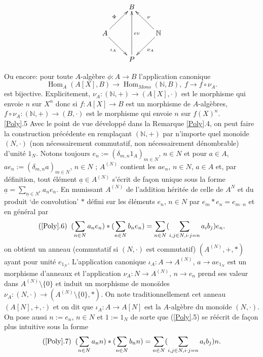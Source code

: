 \documentclass[a4paper, oneside, 12pt]{book}
\theoremstyle{theoremeStyle} %
\theoremstyle{definition} %
\DeclareMathOperator{\SHom}{Hom}
\newcommand{\N}{\mathbb{N}}
\begin{document}
  $$ \xymatrix{ & B \\ A \ar[ru]^\Phi \ar[rd]_{\iota_A} & & \mathbb{N} \ar[lu]_\nu \ar[ld]^{\nu_A} \\ & P \ar[uu]_{ev} } $$

 Ou encore: pour toute $A$-algèbre $\phi:A\rightarrow B$  l'application canonique
$$\SHom_A(A[X],B)\rightarrow \SHom_{Mono}(\N,B),\; f\rightarrow f\circ \nu_A.$$
 est bijective. Explicitement, $\nu_A:(\N,+)\rightarrow (A[X],\cdot)$ est le morphisme qui envoie $n$ sur $X^n$ donc si $f:A[X]\rightarrow B$ est un morphisme de $A$-algèbres, $f\circ \nu_A:(\N,+)\rightarrow (B,\cdot)$  est le morphisme qui envoie $n$ sur $f(X)^n$.\\



  \ref{Poly}.5 Avec le point de vue développé dans la Remarque  \ref{Poly}.4, on peut faire la construction précédente en rempla\c{c}ant $(\N,+)$ par n'importe quel monoïde $(N,\cdot)$ (non nécessairement commutatif, non nécessairement dénombrable) d'unité $1_N$.   Notons toujours $e_{n}:=(\delta_{m,n}1_{A})_{m\in N}$, $n\in N$ et pour $a\in A$, $ae_{n}:=(\delta_{m,n}a)_{m\in  N}$, $n\in N$ ; $A^{(N)}$ contient les $ae_{n}$, $n\in N$, $a\in A$ et, par définition,  tout élément $\underline{a}\in A^{(N)}$ s'écrit de fa\c{c}on unique sous la forme $\underline{a}=\sum_{\underline{n}\in N^r}a_ne_{n}$. En munissant $A^{(N)}$ de l'addition héritée de celle de $A^{N}$ et du produit `de convolution' $*$ défini sur les éléments $e_{n}$, $n\in N$ par
$e_{m}*e_{n}=e_{m\cdot n} $ et en général par
$$(\ref{Poly}.6)\;\; (\sum_{n\in N}a_{n}e_{n}) *(\sum_{n\in N}b_{n}e_{n})=\sum_{n\in N}(\sum_{i,j\in N,i\cdot j=n}a_{i}b_{j})e_{n}.$$
on obtient un anneau (commutatif si $(N,\cdot)$ est commutatif) $(A^{(N)},+,*)$  ayant pour unité $e_{\underline{1_N}}$. L'application canonique $\iota_A:A\rightarrow A^{(N)}$, $a\rightarrow ae_{1_N}  $  est un morphisme d'anneaux et l'application $\nu_A:N\rightarrow A^{(N)}$, $n\rightarrow e_n$ prend ses valeur dans $A^{(N)}\setminus\lbrace 0\rbrace$ et induit un morphisme de monoïdes $\nu_A:(N,\cdot)\rightarrow (A^{(N)}\setminus\lbrace 0\rbrace,*)$.
 On note traditionnellement cet anneau $(A[N],+,\cdot) $ et on dit que $\iota_A:A\rightarrow A[N]$ est la $A$-algèbre du monoïde $(N,\cdot)$. On pose aussi $n:=e_{n}$, $n\in N$    et $1:=1_N$ de sorte que (\ref{Poly}.5) se réécrit de fa\c{c}on plus intuitive sous la forme
 $$(\ref{Poly}.7)\;\; (\sum_{n\in N}a_{n}n) *(\sum_{n\in N}b_{n}n)=\sum_{n\in N}(\sum_{i,j\in N,i\cdot j=n}a_{i}b_{j})n.$$
\end{document}
